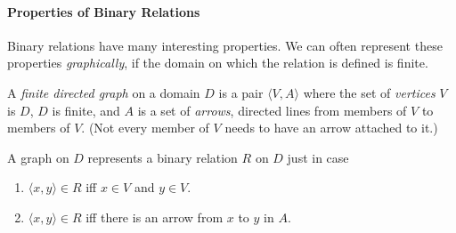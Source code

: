\paragraph{Properties of Binary Relations} Binary relations have many interesting properties. We can often represent these properties \emph{graphically}, if the domain on which the relation is defined is finite. 
\begin{definition}
  A \emph{finite directed graph} on a domain $D$ is a pair $\langle V, A\rangle$ where the set of \emph{vertices} $V$ is $D$, $D$ is finite, and $A$ is a set of \emph{arrows}, directed lines from members of $V$ to members of $V$. (Not every member of $V$ needs to have an arrow attached to it.)
\end{definition} A graph on $D$ represents a binary relation $R$ on $D$ just in case \begin{enumerate}
  \item $\langle x,y\rangle \in R$ iff $x\in V$ and $y \in V$.
  \item $\langle x,y\rangle \in R$ iff there is an arrow from $x$ to $y$ in $A$.
\end{enumerate}
